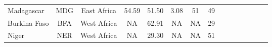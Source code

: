 {\begin{longtable}{lcccccccccccccc}
Madagascar                        & MDG           & East Africa        & 54.59             & 51.50               & 3.08               & 51            & 49              \\
Burkina Faso                      & BFA           & West Africa        & NA                & 62.91               & NA                 & NA            & 29              \\
Niger                             & NER           & West Africa        & NA                & 29.30               & NA                 & NA            & 51      \\   \hline  \hline
 \end{longtable}
 }
